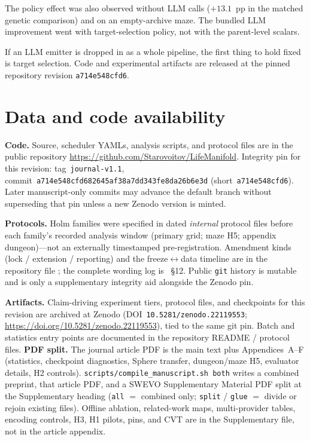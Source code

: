 \documentclass[preprint,12pt]{elsarticle}
\newcommand{\SubmissionGitTag}{journal-v1.1}
\newcommand{\SubmissionGitShort}{a714e548cfd6}
\newcommand{\SubmissionGitFull}{a714e548cfd682645af38a7dd343fe8da26b6e3d}
\newcommand{\ZenodoArtifactsDOI}{10.5281/zenodo.22119553}
\begin{document}
The policy effect was also observed without LLM calls ($+13.1$~pp in the matched genetic comparison) and on an empty-archive maze. The bundled LLM improvement went with target-selection policy, not with the parent-level scalars.

If an LLM emitter is dropped in as a whole pipeline, the first thing to hold fixed is target selection. Code and experimental artifacts are released at the pinned repository revision \texttt{\SubmissionGitShort}.

\section*{Data and code availability}

{\sloppy
\textbf{Code.} Source, scheduler YAMLs, analysis scripts, and protocol files are in the public repository \url{https://github.com/Starovoitov/LifeManifold}. Integrity pin for this revision: tag~\texttt{\SubmissionGitTag}, commit~\texttt{\SubmissionGitFull} (short~\texttt{\SubmissionGitShort}). Later manuscript-only commits may advance the default branch without superseding that pin unless a new Zenodo version is minted.

\textbf{Protocols.} Holm families were specified in dated \emph{internal} protocol files before each family's recorded analysis window (primary grid; maze H5; appendix dungeon)---not an externally timestamped pre-registration. Amendment kinds (lock / extension / reporting) and the freeze$\leftrightarrow$data timeline are in the repository file ; the complete wording log is ~\S12. Public \texttt{git} history is mutable and is only a supplementary integrity aid alongside the Zenodo pin.

\textbf{Artifacts.} Claim-driving experiment tiers, protocol files, and checkpoints for this revision are archived at Zenodo (DOI~\texttt{\ZenodoArtifactsDOI}; \url{https://doi.org/\ZenodoArtifactsDOI}), tied to the same git pin. Batch and statistics entry points are documented in the repository README / protocol files. \textbf{PDF split.} The journal article PDF is the main text plus Appendices~A--F (statistics, checkpoint diagnostics, Sphere transfer, dungeon/maze H5, evaluator details, H2 controls). \texttt{scripts/compile\_manuscript.sh both} writes a combined preprint, that article PDF, and a SWEVO Supplementary Material PDF split at the Supplementary heading (\texttt{all} $=$ combined only; \texttt{split} / \texttt{glue} $=$ divide or rejoin existing files). Offline ablation, related-work maps, multi-provider tables, encoding controls, H3, H1 pilots, pins, and CVT are in the Supplementary file, not in the article appendix.
\par}
\end{document}
